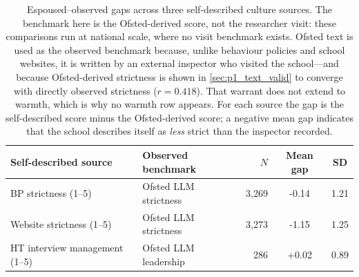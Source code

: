 \begin{table}[htbp]
\centering
\caption{Espoused--observed gaps across three self-described culture sources.
The benchmark here is the Ofsted-derived score, not the researcher visit: these
comparisons run at national scale, where no visit benchmark exists. Ofsted text
is used as the observed benchmark because, unlike behaviour policies and school
websites, it is written by an external inspector who visited the school---and
because Ofsted-derived strictness is shown in \cref{sec:p1_text_valid} to
converge with directly observed strictness ($r = 0.418$). That warrant does not
extend to warmth, which is why no warmth row appears. For each source the gap is
the self-described score minus the Ofsted-derived score; a negative mean gap
indicates that the school describes itself as \emph{less} strict than the
inspector recorded.}
\label{tab:espoused_enacted_gap}
\small
\begin{tabular}{llrcc}
\toprule
Self-described source & Observed benchmark & $N$ & Mean gap & SD \\
\midrule
BP strictness (1--5) & Ofsted LLM strictness & 3,269 & -0.14 & 1.21 \\
Website strictness (1--5) & Ofsted LLM strictness & 3,273 & -1.15 & 1.25 \\
HT interview management (1--5) & Ofsted LLM leadership & 286 & +0.02 & 0.89 \\
\bottomrule
\end{tabular}
\end{table}
